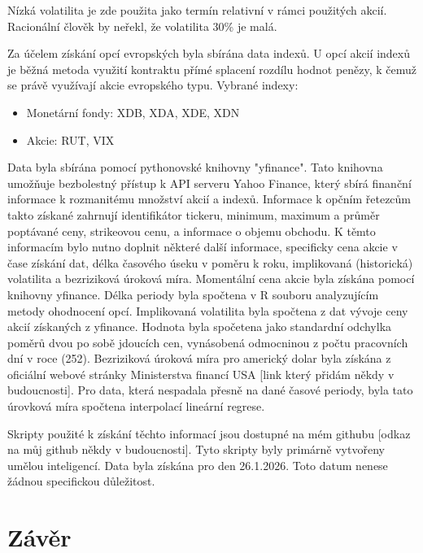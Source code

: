 \documentclass[male,czech,api_bc]{kitheses}
\begin{document}
  Nízká volatilita je zde použita jako termín relativní v rámci použitých akcií. Racionální člověk by neřekl, že volatilita 30\% je malá.

  Za účelem získání opcí evropských byla sbírána data indexů. U opcí akcií indexů je běžná metoda využití kontraktu přímé splacení rozdílu hodnot penězy, k čemuž se právě využívají akcie evropského typu. Vybrané indexy:
  \begin{itemize}
    \item{Monetární fondy: XDB, XDA, XDE, XDN}
    \item{Akcie: RUT, VIX}
  \end{itemize}

  Data byla sbírána pomocí pythonovské knihovny "yfinance". Tato knihovna umožňuje bezbolestný přístup k API serveru Yahoo Finance, který sbírá finanční informace k rozmanitému množství akcií a indexů.
  Informace k opčním řetezcům takto získané zahrnují identifikátor tickeru, minimum, maximum a průměr poptávané ceny, strikeovou cenu, a informace o objemu obchodu.
  K těmto informacím bylo nutno doplnit některé další informace, specificky cena akcie v čase získání dat, délka časového úseku v poměru k roku, implikovaná (historická) volatilita a bezriziková úroková míra.
  Momentální cena akcie byla získána pomocí knihovny yfinance.
  Délka periody byla spočtena v R souboru analyzujícím metody ohodnocení opcí.
  Implikovaná volatilita byla spočtena z dat vývoje ceny akcií získaných z yfinance. Hodnota byla spočetena jako standardní odchylka poměrů dvou po sobě jdoucích cen, vynásobená odmocninou z počtu pracovních dní v roce (252).
  Bezriziková úroková míra pro americký dolar byla získána z oficiální webové stránky Ministerstva financí USA [link který přidám někdy v budoucnosti]. Pro data, která nespadala přesně na dané časové periody, byla tato úrovková míra spočtena interpolací lineární regrese. 

  Skripty použité k získání těchto informací jsou dostupné na mém githubu [odkaz na můj github někdy v budoucnosti]. Tyto skripty byly primárně vytvořeny umělou inteligencí.
  Data byla získána pro den 26.1.2026. Toto datum nenese žádnou specifickou důležitost.

  \chapter{Závěr}

  \printbibliography
  
\end{document}
